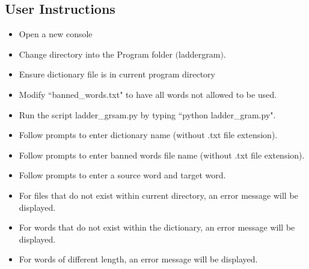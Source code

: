 \documentclass[12pt, a4]{report}
\begin{document}
	\pagebreak
	\subsection{User Instructions}
		\begin{itemize}
			\item Open a new console 
			\item Change directory into the Program folder $($laddergram$)$.
			\item Ensure dictionary file is in current program directory
			\item Modify ``banned\_words.txt" to have all words not allowed to be used.  
			\item Run the script ladder\_grsam.py by typing ``python ladder\_gram.py".
			\item Follow prompts to enter dictionary name (without .txt file extension).
			\item Follow prompts to enter banned words file name (without .txt file extension).
			\item Follow prompts to enter a source word and target word.
			\item For files that do not exist within current directory, an error message will be displayed.
			\item For words that do not exist within the dictionary, an error message will be displayed. 
			\item For words of different length, an error message will be displayed. 
		\end{itemize}


	
\end{document}
